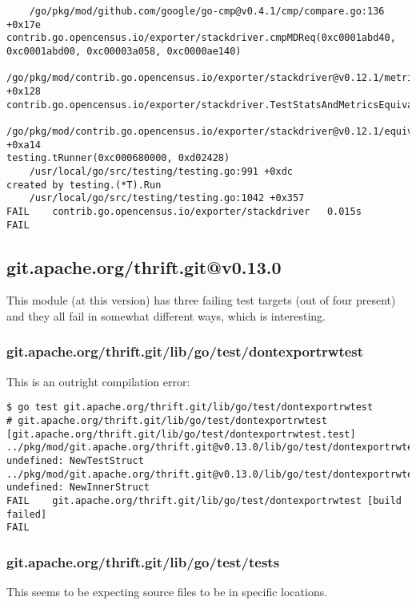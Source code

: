 \documentclass[a4paper]{paper}
\begin{document}
\begin{verbatim}
	/go/pkg/mod/github.com/google/go-cmp@v0.4.1/cmp/compare.go:136 +0x17e
contrib.go.opencensus.io/exporter/stackdriver.cmpMDReq(0xc0001abd40, 0xc0001abd00, 0xc00003a058, 0xc0000ae140)
	/go/pkg/mod/contrib.go.opencensus.io/exporter/stackdriver@v0.12.1/metrics_test_utils.go:53 +0x128
contrib.go.opencensus.io/exporter/stackdriver.TestStatsAndMetricsEquivalence(0xc000680000)
	/go/pkg/mod/contrib.go.opencensus.io/exporter/stackdriver@v0.12.1/equivalence_test.go:105 +0xa14
testing.tRunner(0xc000680000, 0xd02428)
	/usr/local/go/src/testing/testing.go:991 +0xdc
created by testing.(*T).Run
	/usr/local/go/src/testing/testing.go:1042 +0x357
FAIL	contrib.go.opencensus.io/exporter/stackdriver	0.015s
FAIL
\end{verbatim}

\subsection{git.apache.org/thrift.git@v0.13.0}

This module (at this version) has three failing test targets (out of four present) and they all fail in somewhat different ways, which is interesting.

\subsubsection{git.apache.org/thrift.git/lib/go/test/dontexportrwtest}

This is an outright compilation error:

\begin{verbatim}
$ go test git.apache.org/thrift.git/lib/go/test/dontexportrwtest
# git.apache.org/thrift.git/lib/go/test/dontexportrwtest [git.apache.org/thrift.git/lib/go/test/dontexportrwtest.test]
../pkg/mod/git.apache.org/thrift.git@v0.13.0/lib/go/test/dontexportrwtest/compile_test.go:30:7: undefined: NewTestStruct
../pkg/mod/git.apache.org/thrift.git@v0.13.0/lib/go/test/dontexportrwtest/compile_test.go:34:8: undefined: NewInnerStruct
FAIL	git.apache.org/thrift.git/lib/go/test/dontexportrwtest [build failed]
FAIL
\end{verbatim}

\subsubsection{git.apache.org/thrift.git/lib/go/test/tests}

This seems to be expecting source files to be in specific locations.
\end{document}
